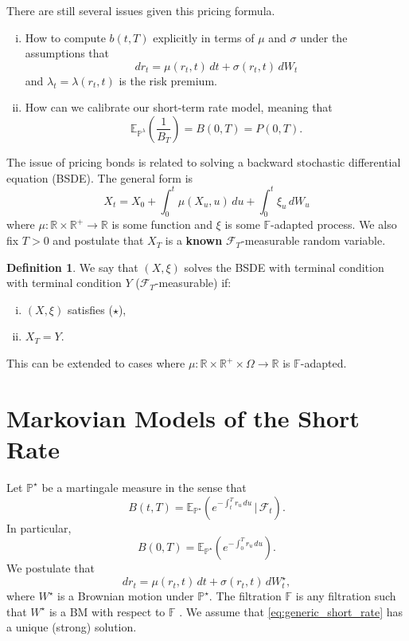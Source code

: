 \documentclass[10pt, oneside, reqno]{amsbook}
\theoremstyle{plain}%
\theoremstyle{definition}
\newtheorem{defn}[thm]{Definition}
\theoremstyle{rem}
\theoremstyle{definition}
\def \P {\ensuremath{\mathcal{P}}}
\newcommand{\given}{ \, | \,}
\newcommand{\sigf}{\mathcal{F}}
\newcommand{\R}{\mathbb{R}}
\newcommand{\E}{\mathbb{E}}
\renewcommand{\P}{\mathbb{P}}
\newcommand{\F}{\mathbb{F}}
\numberwithin{equation}{chapter}
\begin{document}
There are still several issues given this pricing formula. 
\begin{enumerate}[(i)]
    \item How to compute $b(t, T)$ explicitly in terms of $\mu$ and $\sigma$ under the assumptions that \[
        dr_t = \mu(r_t, t) \, dt + \sigma(r_t, t) \, dW_t
    \] and $\lambda_t = \lambda(r_t, t)$ is the risk premium.  
    \item How can we calibrate our short-term rate model, meaning that \[
        \E_{\P^\lambda}\left( \frac{1}{B_T} \right) = B(0, T) = P(0, T).
    \]
\end{enumerate}  

The issue of pricing bonds is related to solving a backward stochastic differential equation (BSDE).  The general form is \[
    X_t = X_0 + \int_0^t \mu (X_u, u) \, du + \int_0^t \xi_u \, dW_u \tag{$\star$}
\]   where $\mu : \R \times \R^+ \rightarrow \R$ is some function and $\xi$ is some $\F$-adapted process.  We also fix $T > 0$ and postulate that $X_T$ is a \textbf{known } $\sigf_T$-measurable random variable. 

\begin{defn}
    We say that $(X, \xi)$ solves the BSDE with terminal condition with terminal condition $Y$ ($\sigf_T$-measurable) if: 
    \begin{enumerate}[(i)]
        \item $(X, \xi)$ satisfies ($\star$), 
        \item $X_T = Y$.  
    \end{enumerate}
    
    This can be extended to cases where $\mu : \R \times \R^+ \times \Omega \rightarrow \R$ is $\F$-adapted.
\end{defn}


\chapter{Markovian Models of the Short Rate} %
\label{cha:markovian_models_of_the_short_rate}

    Let $\P^\star$ be a martingale measure in the sense that \[
        B(t, T) = \E_{\P^\star} \left( e^{-\int_t^T r_u \, du} \given \sigf_t \right).
    \]  In particular, \[
        B(0, T) = \E_{\P^\star} \left( e^{-\int_0^T r_u \, du}  \right).  
    \]  We postulate that \begin{equation}
        dr_t = \mu(r_t, t) \, dt + \sigma(r_t, t) \, dW^\star_t,
        \label{eq:generic_short_rate}
    \end{equation} where $W^\star$ is a Brownian motion under $\P^\star$. The filtration $\F$ is any filtration such that $W^\star$ is a BM with respect to $\F$ .  We assume that \eqref{eq:generic_short_rate} has a unique (strong) solution. 
    
\end{document}
